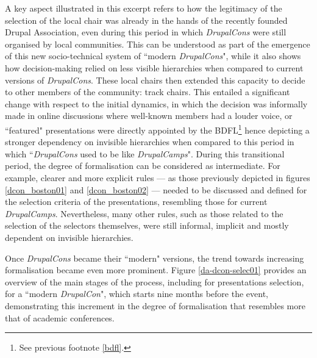 A key aspect illustrated in this excerpt refers to how the legitimacy of the selection of the local chair was already in the hands of the recently founded Drupal Association, even during this period in which \textit{DrupalCons} were still organised by local communities. This can be understood as part of the emergence of this new socio-technical system of ``modern \textit{DrupalCons}", while it also shows how decision-making relied on less visible hierarchies when compared to current versions of \textit{DrupalCons}. These local chairs then extended this capacity to decide to other members of the community: track chairs. This entailed a significant change with respect to the initial dynamics, in which the decision was informally made in online discussions where well-known members had a louder voice, or ``featured" presentations were directly appointed by the BDFL\footnote{See previous footnote \ref{bdfl}.} hence depicting a stronger dependency on invisible hierarchies when compared to this period in which ``\textit{DrupalCons} used to be like \textit{DrupalCamps}". During this transitional period, the degree of formalisation can be considered as intermediate. For example, clearer and more explicit rules --- as those previously depicted in figures \ref{dcon_boston01} and \ref{dcon_boston02} --- needed to be discussed and defined for the selection criteria of the presentations, resembling those for current \textit{DrupalCamps}. Nevertheless, many other rules, such as those related to the selection of the selectors themselves, were still informal, implicit and mostly dependent on invisible hierarchies.

Once \textit{DrupalCons} became their ``modern" versions, the trend towards increasing formalisation became even more prominent. Figure \ref{da-dcon-selec01} provides an overview of the main stages of the process, including for presentations selection, for a ``modern \textit{DrupalCon}", which starts nine months before the event, demonstrating this increment in the degree of formalisation that resembles more that of academic conferences.

